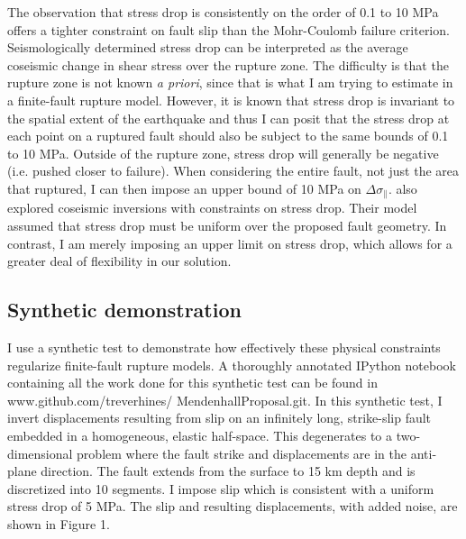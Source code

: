 \documentclass[12pt]{article}
\begin{document}
The observation that stress drop is consistently on the order of 0.1 to 10 MPa offers a tighter constraint on fault slip than the Mohr-Coulomb failure criterion.  Seismologically determined stress drop can be interpreted as the average coseismic change in shear stress over the rupture zone.  The difficulty is that the rupture zone is not known \textit{a priori}, since that is what I am trying to estimate in a finite-fault rupture model.  However, it is known that stress drop is invariant to the spatial extent of the earthquake and thus I can posit that the stress drop at each point on a ruptured fault should also be subject to the same bounds of 0.1 to 10 MPa.  Outside of the rupture zone, stress drop will generally be negative (i.e. pushed closer to failure).  When considering the entire fault, not just the area that ruptured, I can then impose an upper bound of 10 MPa on $\Delta \sigma_\parallel$.  \citet{Sun2011} also explored coseismic inversions with constraints on stress drop.  Their model assumed that stress drop must be uniform over the proposed fault geometry.   In contrast, I am merely imposing an upper limit on stress drop, which allows for a greater deal of flexibility in our solution.        

\subsection*{Synthetic demonstration}
I use a synthetic test to demonstrate how effectively these physical constraints regularize finite-fault rupture models.  A thoroughly annotated IPython notebook containing all the work done for this synthetic test can be found in www.github.com/treverhines/ MendenhallProposal.git.  In this synthetic test, I invert displacements resulting from slip on an infinitely long, strike-slip fault embedded in a homogeneous, elastic half-space.  This degenerates to a two-dimensional problem where the fault strike and displacements are in the anti-plane direction.  The fault extends from the surface to 15 km depth and is discretized into 10 segments. I impose slip which is consistent with a uniform stress drop of 5 MPa.  The slip and resulting displacements, with added noise, are shown in Figure 1.
\end{document}
